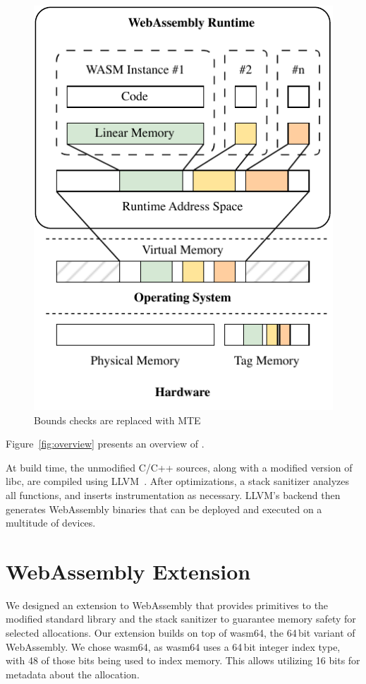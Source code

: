 \begin{figure}[t]
    \centering
    \includegraphics[scale=1]{figures/build/system-design-1}
    \caption{Bounds checks are replaced with MTE}
    \label{fig:system-design-1}
\end{figure}

Figure~\ref{fig:overview} presents an overview of \projectname{}.

At build time, the unmodified C/C++ sources, along with a modified version of libc, are compiled using LLVM~\cite{lattner2004llvm}.
After optimizations, a stack sanitizer analyzes all functions, and inserts instrumentation as necessary.
LLVM's backend then generates WebAssembly binaries that can be deployed and executed on a multitude of devices.

\section{WebAssembly Extension}
\label{sec:wasm-extension}

We designed an extension to WebAssembly that provides primitives to the modified standard library and the stack sanitizer to guarantee memory safety for selected allocations.
Our extension builds on top of wasm64, the 64\,bit variant of WebAssembly.
We chose wasm64, as wasm64 uses a 64\,bit integer index type, with 48 of those bits being used to index memory.
This allows utilizing 16 bits for metadata about the allocation.

